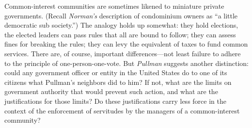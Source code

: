 
\item Common-interest communities are sometimes likened to miniature private
governments. (Recall \textit{Norman's} description of condominium owners as ``a
little democratic sub society.'') The analogy holds up somewhat: they hold
elections, the elected leaders can pass rules that all are bound to follow; they
can assess fines for breaking the rules; they can levy the equivalent of taxes
to fund common services. There are, of course, important differences---not least
failure to adhere to the principle of one-person-one-vote. But \textit{Pullman}
suggests another distinction: could any government officer or entity in the
United States do to one of its citizens what Pullman's neighbors did to him? If
not, what are the limits on government authority that would prevent such action,
and what are the justifications for those limits? Do these justifications carry
less force in the context of the enforcement of servitudes by the managers of a
common-interest community?

